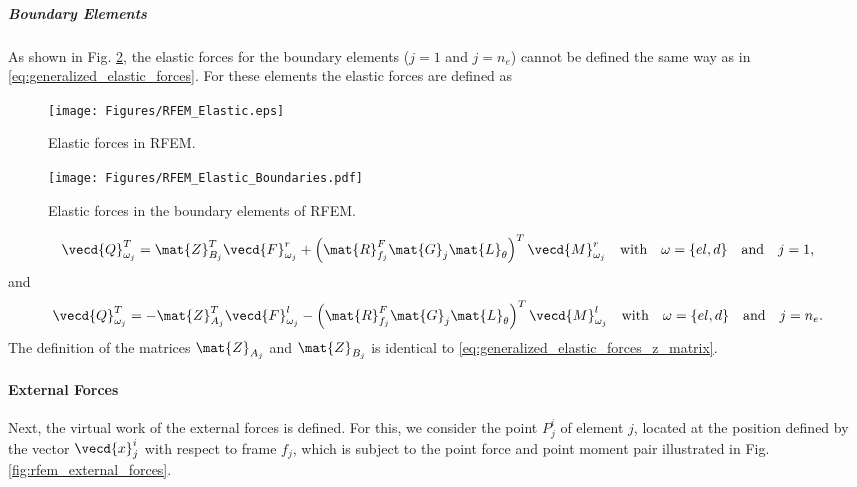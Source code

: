 \subparagraph{Boundary Elements}
As shown in Fig. \ref{fig:rfem_elastic_forces_boundaries}, the elastic forces
for the boundary elements (${j=1}$ and $j={n_e}$)
cannot be defined the same way as in \eqref{eq:generalized_elastic_forces}.
For these elements the elastic forces are defined as 
\begin{figure}
    \centering\texttt{[image: Figures/RFEM\_Elastic.eps]}
    \caption{Elastic forces in RFEM.}
    \label{fig:rfem_elastic_forces}
\end{figure}
\begin{figure}
    \centering\texttt{[image: Figures/RFEM\_Elastic\_Boundaries.pdf]}
    \caption{Elastic forces in the boundary elements of RFEM.}
    \label{fig:rfem_elastic_forces_boundaries}
\end{figure}
\[
    \vecd{Q}_{{\omega}_{j}}^{T} = \mat{Z}_{B_{j}}^{T} \vecd{F}_{{\omega}_j}^{r} +
    \left(\mat{R}_{f_j}^{F} \mat{G}_{j} \mat{L}_{\theta}\right)^{T}
    \vecd{M}_{{\omega}_j}^{r}
    \quad \text{with} \quad  \omega= \{el, d\} \quad \text{and} \quad j=1,
\]
and 
\[
    \vecd{Q}_{{\omega}_{j}}^{T} = - {\mat{Z}}_{A_{j}}^{T}
    \vecd{F}_{{\omega}_{j}}^{l} - \left(\mat{R}_{f_j}^{F}
    \mat{G}_{j} \mat{L}_{\theta}\right)^{T} \vecd{M}_{{\omega}_j}^{l}
    \quad \text{with} \quad  \omega= \{el, d\} \quad \text{and} \quad j={n_e}.
\]
The definition of the matrices ${\mat{Z}}_{A_{j}}$ and ${\mat{Z}}_{B_{j}}$ 
is identical to \eqref{eq:generalized_elastic_forces_z_matrix}.

\paragraph{External Forces}
Next, the virtual work of the external forces is defined. For this, we consider
the point $P^{i}_{j}$ of element $j$, located at the position defined by the
vector $\vecd{x}_{j}^{i}$ with respect to frame $f_{j}$, which is subject to
the point force and point moment pair illustrated in Fig.
\ref{fig:rfem_external_forces}.


